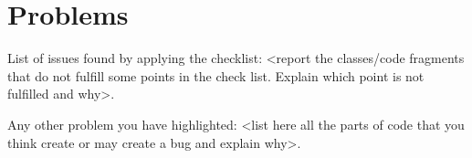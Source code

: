 \chapter{Problems}

List of issues found by applying the checklist: <report the classes/code fragments that do not fulfill some points in the check list. Explain which point is not fulfilled and why>.

Any other problem you have highlighted: <list here all the parts of code that you think create or may create a bug and explain why>.


\lipsum[1-4]
